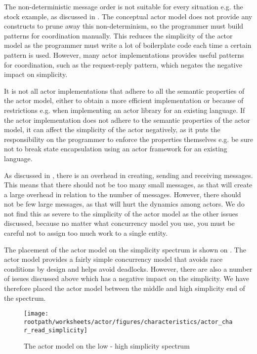 The non-deterministic message order is not suitable for every situation e.g. the stock example, as discussed in . The conceptual actor model does not provide any constructs to prune away this non-determinism, so the programmer must build patterns for coordination manually. This reduces the simplicity of the actor model as the programmer must write a lot of boilerplate code each time a certain pattern is used. However, many actor implementations provides useful patterns for coordination, such as the request-reply pattern, which negates the negative impact on simplicity.

It is not all actor implementations that adhere to all the semantic properties of the actor model, either to obtain a more efficient implementation or because of restrictions e.g. when implementing an actor library for an existing language. If the actor implementation does not adhere to the semantic properties of the actor model, it can affect the simplicity of the actor negatively, as it puts the responsibility on the programmer to enforce the properties themselves e.g. be sure not to break state encapsulation using an actor framework for an existing language.

As discussed in , there is an overhead in creating, sending and receiving messages. This means that there should not be too many small messages, as that will create a large overhead in relation to the number of messages. However, there should not be few large messages, as that will hurt the dynamics among actors. We do not find this as severe to the simplicity of the actor model as the other issues discussed, because no matter what concurrency model you use, you must be careful not to assign too much work to a single entity. 

The placement of the actor model on the simplicity spectrum is shown on . The actor model provides a fairly simple concurrency model that avoids race conditions by design and helps avoid deadlocks. However, there are also a number of issues discussed above which has a negative impact on the simplicity. We have therefore placed the actor model between the middle and high simplicity end of the spectrum.

\begin{figure}[htbp]
\centering
 \texttt{[image: \\rootpath/worksheets/actor/figures/characteristics/actor\_char\_read\_simplicity]} 
 \caption{The actor model on the low - high simplicity spectrum}
\label{fig:actor_read_simplicity}
\end{figure}
